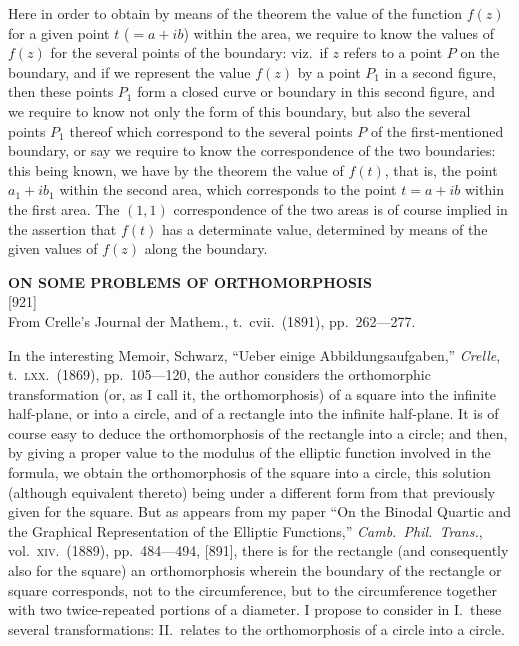 \documentclass[11pt,a4paper]{article}
\newcommand{\paper}[4]{%
  \newpage
  \begin{center}
    {\large\bfseries #2}\\[0.5em]
    {\small [#1]}\\[0.3em]
    {\small #3}
  \end{center}
  \vspace{0.5em}
}
\begin{document}
Here in order to obtain by means of the theorem the value of the function $f(z)$ for a given point $t$ ($= a + ib$) within the area, we require to know the values of $f(z)$ for the several points of the boundary: viz.\ if $z$ refers to a point $P$ on the boundary, and if we represent the value $f(z)$ by a point $P_1$ in a second figure, then these points $P_1$ form a closed curve or boundary in this second figure, and we require to know not only the form of this boundary, but also the several points $P_1$ thereof which correspond to the several points $P$ of the first-mentioned boundary, or say we require to know the correspondence of the two boundaries: this being known, we have by the theorem the value of $f(t)$, that is, the point $a_1 + i b_1$ within the second area, which corresponds to the point $t = a + i b$ within the first area. The $(1, 1)$ correspondence of the two areas is of course implied in the assertion that $f(t)$ has a determinate value, determined by means of the given values of $f(z)$ along the boundary.

\paper{921}{ON SOME PROBLEMS OF ORTHOMORPHOSIS}{From Crelle's Journal der Mathem., t.~cvii.\ (1891), pp.~262---277.}{}

In the interesting Memoir, Schwarz, ``Ueber einige Abbildungsaufgaben,'' \textit{Crelle}, t.~\textsc{lxx}.\ (1869), pp.\ 105---120, the author considers the orthomorphic transformation (or, as I call it, the orthomorphosis) of a square into the infinite half-plane, or into a circle, and of a rectangle into the infinite half-plane. It is of course easy to deduce the orthomorphosis of the rectangle into a circle; and then, by giving a proper value to the modulus of the elliptic function involved in the formula, we obtain the orthomorphosis of the square into a circle, this solution (although equivalent thereto) being under a different form from that previously given for the square. But as appears from my paper ``On the Binodal Quartic and the Graphical Representation of the Elliptic Functions,'' \textit{Camb.\ Phil.\ Trans.}, vol.~\textsc{xiv}.\ (1889), pp.\ 484---494, [891], there is for the rectangle (and consequently also for the square) an orthomorphosis wherein the boundary of the rectangle or square corresponds, not to the circumference, but to the circumference together with two twice-repeated portions of a diameter. I propose to consider in I.\ these several transformations: II.\ relates to the orthomorphosis of a circle into a circle.
\end{document}
